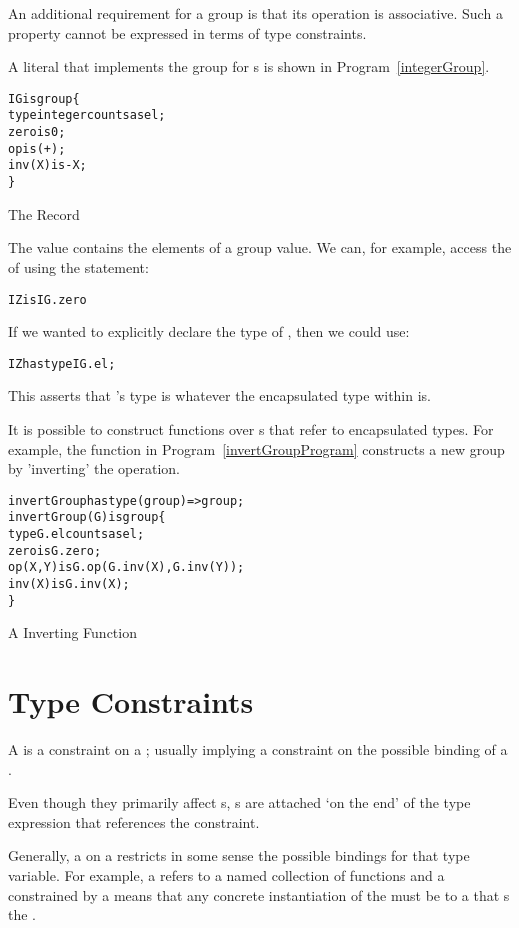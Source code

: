 \begin{aside}
An additional requirement for a group is that its operation is associative. Such a property cannot be expressed in terms of type constraints.
\end{aside}

A  literal that implements the group for s is shown in Program~\vref{integerGroup}.
\begin{program}
\begin{alltt}
IG is group\{
  type integer counts as el;
  zero is 0;
  op is (+);
  inv(X) is -X;
\}
\end{alltt}
\caption{The   Record}
\label{integerGroup}
\end{program}
The  value contains the elements of a group value. We can, for example, access the  of  using the statement:
\begin{alltt}
IZ is IG.zero
\end{alltt}
If we wanted to explicitly declare the type of , then we could use:
\begin{alltt}
IZ has type IG.el;
\end{alltt}
This asserts that 's type is whatever the encapsulated type within  is.

It is possible to construct functions over s that refer to encapsulated types. For example, the  function in Program~\vref{invertGroupProgram} constructs a new group by 'inverting' the operation.

\begin{program}
\begin{alltt}
invertGroup has type (group)=>group;
invertGroup(G) is group\{
  type G.el counts as el;
  zero is G.zero;
  op(X,Y) is G.op(G.inv(X),G.inv(Y));
  inv(X) is G.inv(X);
\}
\end{alltt}
\caption{A  Inverting Function}
\label{invertGroupProgram}
\end{program}

\section{Type Constraints}
\label{typeConstraints}

A  is a constraint on a ; usually implying a constraint on the possible binding of a . 
\begin{aside}
Even though they primarily affect s, s are attached `on the end' of the type expression that references the constraint.
\end{aside}
Generally, a  on a  restricts in some sense the possible bindings for that type variable. For example, a  refers to a named collection of functions and a  constrained by a  means that any concrete instantiation of the  must be to a  that s the .

